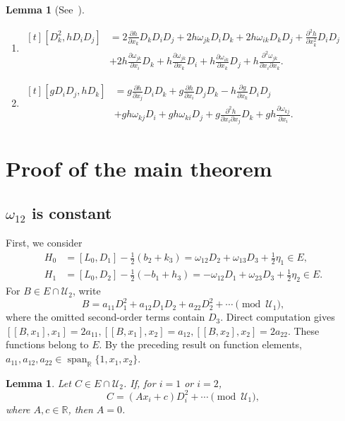 \documentclass{tCON2e}
\newenvironment{revision}{\begingroup\color{black}}{\endgroup}
\numberwithin{equation}{section}
\theoremstyle{journalplain}
\newtheorem{lemma}[theorem]{Lemma}
\theoremstyle{journaldef}
\newenvironment{revision}{}{}
\begin{document}
\begin{revision}
\begin{lemma}[See~\citep{Yau1994FiniteDimensional,Chiou1994FiniteDimensional}]
\begin{enumerate}
\item
\(
\begin{aligned}[t]
[D_k^2,hD_iD_j]
&=
2\frac{\partial h}{\partial x_k}D_kD_iD_j
+2h\omega_{jk}D_iD_k
+2h\omega_{ik}D_kD_j
+\frac{\partial^2h}{\partial x_k^2}D_iD_j\\
&+2h\frac{\partial\omega_{jk}}{\partial x_i}D_k
+h\frac{\partial\omega_{jk}}{\partial x_k}D_i
+h\frac{\partial\omega_{ik}}{\partial x_k}D_j
+h\frac{\partial^2\omega_{jk}}{\partial x_i\partial x_k}.
\end{aligned}
\)

\item
\(
\begin{aligned}[t]
[gD_iD_j,hD_k]
&=
g\frac{\partial h}{\partial x_j}D_iD_k
+g\frac{\partial h}{\partial x_i}D_jD_k
-h\frac{\partial g}{\partial x_k}D_iD_j\\
&
+gh\omega_{kj}D_i
+gh\omega_{ki}D_j
+g\frac{\partial^2h}{\partial x_i\partial x_j}D_k
+gh\frac{\partial\omega_{kj}}{\partial x_i}.
\end{aligned}
\)

\end{enumerate}
\end{lemma}

\section{Proof of the main theorem}\label{sec:3}
\subsection{$\omega_{12}$ is constant}\label{sec:visible}

First, we consider
\begin{align}
H_0
&=[L_0,D_1]-\frac12(b_2+k_3)
 =\omega_{12}D_2+\omega_{13}D_3+\frac12\eta_1 \in E,
\label{eq:H0bar}\\
H_1
&=[L_0,D_2]-\frac12(-b_1+h_3)
 =-\omega_{12}D_1+\omega_{23}D_3+\frac12\eta_2 \in E.
\label{eq:H1bar}
\end{align}
For $B\in E\cap\mathcal U_2$, write
\[
B=a_{11}D_1^2+a_{12}D_1D_2+a_{22}D_2^2+\cdots
\pmod{\mathcal U_1},
\]
where the omitted second-order terms contain $D_3$.
Direct computation gives
\(
[[B,x_1],x_1]=2a_{11},
[[B,x_1],x_2]=a_{12},
[[B,x_2],x_2]=2a_{22}.
\)
These functions belong to $E$. By the preceding result on function
elements,
\(
a_{11},a_{12},a_{22}
\in\operatorname{span}_{\mathbb R}\{1,x_1,x_2\}.
\)

\begin{lemma}\label{lem:linear-diagonal-coefficient}
Let $C\in E\cap\mathcal U_2$. If, for $i=1$ or $i=2$,
\[
C=(Ax_i+c)D_i^2+\cdots\pmod{\mathcal U_1},
\]
where $A,c\in\mathbb R$, then $A=0$.
\end{lemma}


\end{revision}
\end{document}
